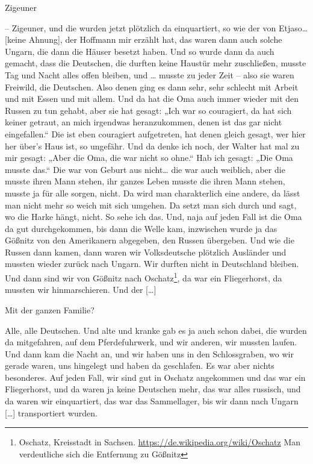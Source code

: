 \documentclass[ngerman,]{article}
\providecommand{\tightlist}{%
  \setlength{\itemsep}{0pt}\setlength{\parskip}{0pt}}
\begin{document}
\begin{multicols}{2}
\begin{description}
\tightlist
\item[Friedrich{[}?{]}]
Zigeuner
\item[Käthe]
– Zigeuner, und die wurden jetzt plötzlich da einquartiert, so wie der
von Etjaso\ldots{} {[}keine Ahnung{]}, der Hoffmann mir erzählt hat, das
waren dann auch solche Ungarn, die dann die Häuser besetzt haben. Und so
wurde dann da auch gemacht, dass die Deutschen, die durften keine
Haustür mehr zuschließen, musste Tag und Nacht alles offen bleiben, und
\ldots{} musste zu jeder Zeit – also sie waren Freiwild, die Deutschen.
Also denen ging es dann sehr, sehr schlecht mit Arbeit und mit Essen und
mit allem. Und da hat die Oma auch immer wieder mit den Russen zu tun
gehabt, aber sie hat gesagt: „Ich war so couragiert, da hat sich keiner
getraut, an mich irgendwas heranzukommen, denen ist das gar nicht
eingefallen.“ Die ist eben couragiert aufgetreten, hat denen gleich
gesagt, wer hier her über's Haus ist, so ungefähr. Und da denke ich
noch, der Walter hat mal zu mir gesagt: „Aber die Oma, die war nicht so
ohne.“ Hab ich gesagt: „Die Oma musste das.“ Die war von Geburt aus
nicht\ldots{} die war auch weiblich, aber die musste ihren Mann stehen,
ihr ganzes Leben musste die ihren Mann stehen, musste ja für alle
sorgen, nicht. Da wird man charakterlich eine andere, da lässt man nicht
mehr so weich mit sich umgehen. Da setzt man sich durch und sagt, wo die
Harke hängt, nicht. So sehe ich das. Und, naja auf jeden Fall ist die
Oma da gut durchgekommen, bis dann die Welle kam, inzwischen wurde ja
das Gößnitz von den Amerikanern abgegeben, den Russen übergeben. Und wie
die Russen dann kamen, dann waren wir Volksdeutsche plötzlich Ausländer
und mussten wieder zurück nach Ungarn. Wir durften nicht in Deutschland
bleiben. Und dann sind wir von Gößnitz nach Oschatz\footnote{Oschatz,
  Kreisstadt in Sachsen. \url{https://de.wikipedia.org/wiki/Oschatz} Man
  verdeutliche sich die Entfernung zu Gößnitz}, da war ein Fliegerhorst,
da mussten wir hinmarschieren. Und der {[}\ldots{}{]}
\item[Ruth]
Mit der ganzen Familie?
\item[Käthe]
Alle, alle Deutschen. Und alte und kranke gab es ja auch schon dabei,
die wurden da mitgefahren, auf dem Pferdefuhrwerk, und wir anderen, wir
mussten laufen. Und dann kam die Nacht an, und wir haben uns in den
Schlossgraben, wo wir gerade waren, uns hingelegt und haben da
geschlafen. Es war aber nichts besonderes. Auf jeden Fall, wir sind gut
in Oschatz angekommen und das war ein Fliegerhorst, und da waren ja
keine Deutschen mehr, das war alles russisch, und da waren wir
einquartiert, das war das Sammellager, bis wir dann nach Ungarn
{[}\ldots{}{]} transportiert wurden.
\end{description}


\end{multicols}
\end{document}
